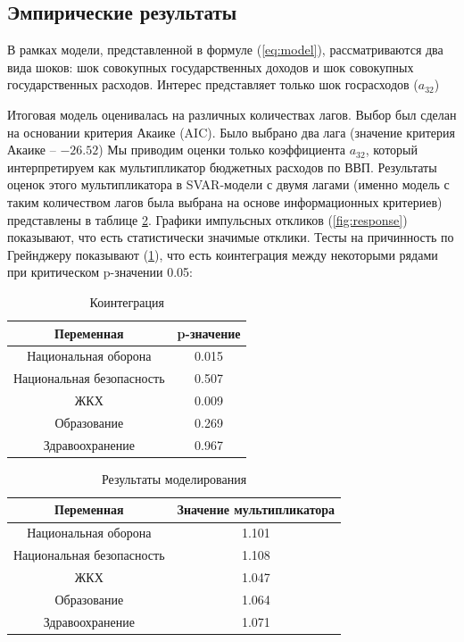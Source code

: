 \documentclass[12pt, a4paper]{extarticle}
\begin{document}
\subsection{Эмпирические результаты}
\par
В рамках модели, представленной в формуле (\ref{eq:model}), рассматриваются два вида шоков: шок совокупных государственных доходов и шок совокупных государственных расходов. Интерес представляет только шок госрасходов ($a_{32}$)
\par
Итоговая модель оценивалась на различных количествах лагов. Выбор был сделан на основании критерия Акаике (AIC). Было выбрано два лага (значение критерия Акаике -- $-26.52$) Мы приводим оценки только коэффициента $a_{32}$, который интерпретируем как мультипликатор бюджетных расходов по ВВП. Результаты оценок этого мультипликатора в SVAR-модели с двумя лагами (именно модель с таким количеством лагов была выбрана на основе информационных критериев) представлены в таблице \ref{table:result}. Графики импульсных откликов (\figurename{\ref{fig:response}}) показывают, что есть статистически значимые отклики. Тесты на причинность по Грейнджеру показывают (\tablename {\ref{table:granger}}), что есть коинтеграция между некоторыми рядами при критическом p-значении 0.05:

\begin{table}[ht]
  \caption{Коинтеграция}
  \centering
  \begin{tabular}{|c|c|}
    \toprule
    Переменная & p-значение \\
    \midrule
    Национальная оборона & 0.015 \\ \hline
    Национальная безопасность & 0.507\\ \hline
    ЖКХ &  0.009 \\ \hline
    Образование & 0.269 \\ \hline
    Здравоохранение & 0.967 \\ \hline
  \end{tabular}
  \label{table:granger}
\end{table}


\begin{table}[ht]
  \caption{Результаты моделирования}
  \centering
  \begin{tabular}{|c|c|}
    \toprule
    Переменная & Значение мультипликатора \\
    \midrule
    Национальная оборона & 1.101 \\ \hline
    Национальная безопасность & 1.108\\ \hline
    ЖКХ &  1.047 \\ \hline
    Образование & 1.064 \\ \hline
    Здравоохранение & 1.071 \\ \hline
  \end{tabular}
  \label{table:result}
\end{table}
\end{document}
